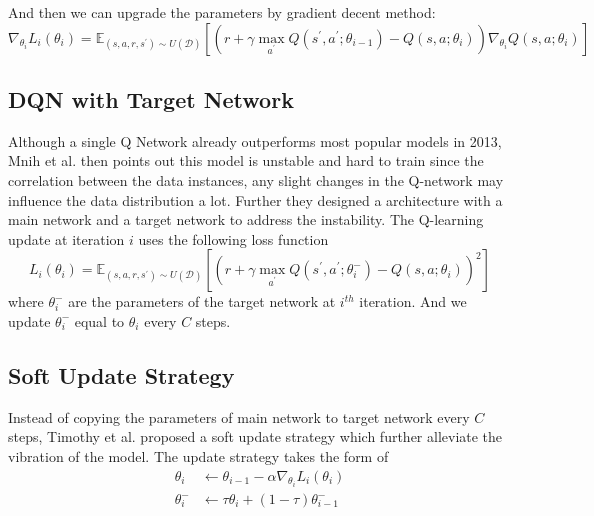 \documentclass[12pt]{article}
\begin{document}
And then we can upgrade the parameters by gradient decent method:
\begin{equation}
\nabla_{\theta_{i}} L_{i}\left(\theta_{i}\right)=\mathbb{E}_{\left(s, a, r, s^{\prime}\right) \sim U(\mathcal{D})}\left[\left(r+\gamma \max _{a^{\prime}} Q\left(s^{\prime}, a^{\prime} ; \theta_{i-1}\right)-Q\left(s, a ; \theta_{i}\right)\right) \nabla_{\theta_{i}} Q\left(s, a ; \theta_{i}\right)\right]
\end{equation}

\subsection{DQN with Target Network}
Although a single Q Network already outperforms most popular models in 2013, Mnih et al. \cite{DBLP:journals/nature/MnihKSRVBGRFOPB15} then points out this model is unstable and hard to train since the correlation between the data instances, any slight changes in the Q-network may influence the data distribution a lot. Further they designed a architecture with a main network and a target network to address the instability. The Q-learning update at iteration $i$ uses the following loss function
\begin{equation}
L_{i}\left(\theta_{i}\right)=\mathbb{E}_{\left(s, a, r, s^{\prime}\right) \sim U(\mathcal{D})}\left[\left(r+\gamma \max _{a^{\prime}} Q\left(s^{\prime}, a^{\prime} ; \theta_{i}^{-}\right)-Q\left(s, a ; \theta_{i}\right)\right)^{2}\right]  
\end{equation}
where $\theta_{i}^{-}$ are the parameters of the target network at $i^{th}$ iteration. And we update $\theta_{i}^{-}$ equal to $\theta_{i}$ every $C$ steps.

\subsection{Soft Update Strategy}
Instead of copying the parameters of main network to target network every $C$ steps, Timothy et al. \cite{DBLP:journals/corr/LillicrapHPHETS15} proposed a soft update strategy which further alleviate the vibration of the model. The update strategy takes the form of
\begin{equation}
    \begin{aligned}
    \theta_{i} &\leftarrow \theta_{i-1} - \alpha\nabla_{\theta_{i}} L_{i}\left(\theta_{i}\right)\\
    \theta_{i}^{-} &\leftarrow \tau \theta_{i} + (1 - \tau)\theta_{i-1}^{-}
    \end{aligned}
\end{equation}
\end{document}
